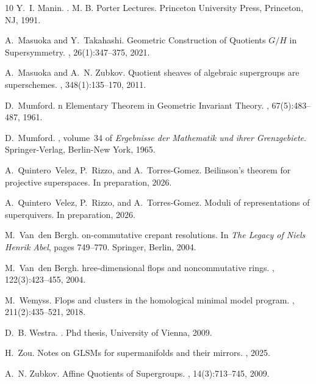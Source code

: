 \documentclass[11pt,a4paper,reqno,noamsfonts]{amsart}
\numberwithin{equation}{section}
\theoremstyle{definition}
\theoremstyle{remark}
\begin{document}
\begin{thebibliography}{10}
Y.~I. Manin.
.
\newblock M. B. Porter Lectures. Princeton University Press, Princeton, NJ,
  1991.

A.~Masuoka and Y.~Takahashi.
\newblock Geometric {C}onstruction of {Q}uotients ${G}/{H}$ in {S}upersymmetry.
, 26(1):347--375, 2021.

A.~Masuoka and A.~N. Zubkov.
\newblock Quotient sheaves of algebraic supergroups are superschemes.
, 348(1):135--170, 2011.

D.~Mumford.
n {E}lementary {T}heorem in {G}eometric {I}nvariant {T}heory.
, 67(5):483--487, 1961.

D.~Mumford.
, volume~34 of {\em Ergebnisse
  der Mathematik und ihrer Grenzgebiete}.
\newblock Springer-Verlag, Berlin-New York, 1965.

A.~Quintero~Velez, P.~Rizzo, and A.~Torres-Gomez.
\newblock Beilinson's theorem for projective superspaces.
\newblock In preparation, 2026.

A.~Quintero~Velez, P.~Rizzo, and A.~Torres-Gomez.
\newblock Moduli of representations of superquivers.
\newblock In preparation, 2026.

M.~Van~den Bergh.
on-commutative crepant resolutions.
\newblock In {\em The Legacy of Niels Henrik Abel}, pages 749--770. Springer,
  Berlin, 2004.

M.~Van~den Bergh.
hree-dimensional flops and noncommutative rings.
, 122(3):423--455, 2004.

M.~Wemyss.
\newblock Flops and clusters in the homological minimal model program.
, 211(2):435--521, 2018.

D.~B. Westra.
.
\newblock Phd thesis, University of Vienna, 2009.

H.~Zou.
\newblock Notes on {GLSM}s for supermanifolds and their mirrors.
, 2025.

A.~N. Zubkov.
\newblock Affine {Q}uotients of {S}upergroups.
, 14(3):713--745, 2009.

\end{thebibliography}
\end{document}
